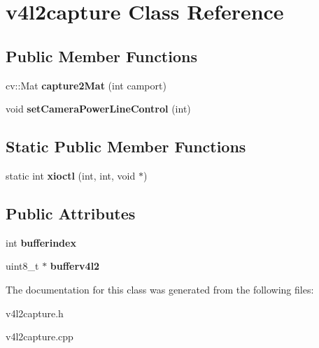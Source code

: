 \hypertarget{classv4l2capture}{}\section{v4l2capture Class Reference}
\label{classv4l2capture}
\subsection*{Public Member Functions}
\begin{DoxyCompactItemize}
\item 
\mbox{\label{classv4l2capture_a67881540e9f7752081e011f0c26b5dc3}} 
cv\+::\+Mat {\bfseries capture2\+Mat} (int camport)
\item 
\mbox{\label{classv4l2capture_a8b50385c66fde629fa20853bafbb1a71}} 
void {\bfseries set\+Camera\+Power\+Line\+Control} (int)
\end{DoxyCompactItemize}
\subsection*{Static Public Member Functions}
\begin{DoxyCompactItemize}
\item 
\mbox{\label{classv4l2capture_a992711975d2a7e9103a70f16381566a5}} 
static int {\bfseries xioctl} (int, int, void $\ast$)
\end{DoxyCompactItemize}
\subsection*{Public Attributes}
\begin{DoxyCompactItemize}
\item 
\mbox{\label{classv4l2capture_ab489ca6df418b82a5a7e38a40ecbd072}} 
int {\bfseries bufferindex}
\item 
\mbox{\label{classv4l2capture_a002596012a657321813ece097576f56e}} 
uint8\+\_\+t $\ast$ {\bfseries bufferv4l2}
\end{DoxyCompactItemize}


The documentation for this class was generated from the following files\+:\begin{DoxyCompactItemize}
\item 
v4l2capture.\+h\item 
v4l2capture.\+cpp\end{DoxyCompactItemize}
